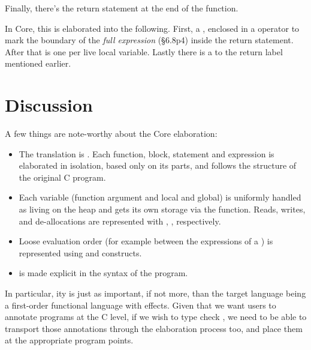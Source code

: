 
Finally, there's the return statement at the end of the function.


In Core, this is elaborated into the following. First, a
, enclosed in a  operator %
to mark the boundary of the \emph{full expression} (§6.8p4) inside the return
statement. After that is one  per live  %
local variable. Lastly there is a  to the %
return label  mentioned earlier.


\section{Discussion}

A few things are note-worthy about the Core elaboration:
\begin{itemize}
    \item The translation is . Each function, block,
        statement and expression is elaborated in isolation, based only
        on its parts, and follows the structure of the original C program.
    \item Each variable (function argument and local and global) is uniformly
        handled as living on the heap and gets its own storage via the
         function. Reads, writes, and de-allocations are
        represented with , ,
         respectively.
    \item Loose evaluation order (for example between the expressions of a \cinline{==})
        is represented using  and  constructs.
    \item {} is made explicit in the syntax of the program.
\end{itemize}

In particular, ity is just as important, if not more, than the
target language being a first-order functional language with effects. Given
that we want users to annotate programs at the C level, if we wish to type
check , we need to be able to transport those annotations through the
elaboration process too, and place them at the appropriate program points.


